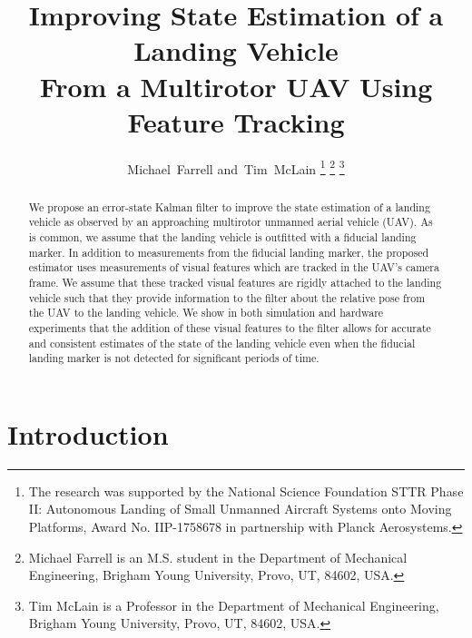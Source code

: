 \documentclass[letterpaper, 10 pt, conference]{ieeeconf}  %
\begin{document}
\title{\LARGE \bf
Improving State Estimation of a Landing Vehicle \\
From a Multirotor UAV Using Feature Tracking
}

\author{Michael~Farrell
        and~Tim~McLain
\thanks{The research was supported by the National Science Foundation STTR Phase II: Autonomous Landing of Small Unmanned Aircraft Systems onto Moving Platforms, Award No. IIP-1758678 in partnership with Planck Aerosystems.}
\thanks{Michael Farrell is an M.S. student in the Department of Mechanical
Engineering, Brigham Young University, Provo, UT, 84602, USA.}%
\thanks{Tim McLain is a Professor in the Department of Mechanical
Engineering, Brigham Young University, Provo, UT, 84602, USA.}%
}

\maketitle
\thispagestyle{empty}
\pagestyle{empty}

\begin{abstract}
  We propose an error-state Kalman filter to improve the state estimation of a
  landing vehicle as observed by an approaching multirotor unmanned aerial
  vehicle (UAV). As is common, we
  assume that the landing vehicle is outfitted with a fiducial landing marker.
  In addition to measurements from the fiducial landing marker, the proposed
  estimator uses measurements of visual features which are tracked in the UAV's
  camera frame. We assume that these tracked visual features are rigidly
  attached to the landing vehicle such that they provide information to the
  filter about the relative pose from the UAV to the landing vehicle. We show
  in both simulation and hardware experiments that the addition of these visual
  features to the filter allows for accurate and consistent estimates of the
  state of the landing vehicle even when the fiducial landing marker is not
  detected for significant periods of time.
\end{abstract}

\section{Introduction} \label{sec:intro}

% 

\end{document}
